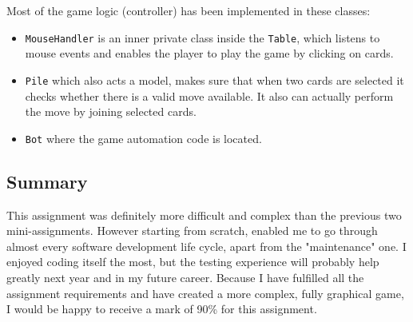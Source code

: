 \documentclass[a4paper, 11pt, titlepage]{article}
\begin{document}
Most of the game logic (controller) has been implemented in these classes:
\begin{itemize}
	\item \texttt{MouseHandler} is an inner private class inside the \texttt{Table}, 
		which listens to mouse events and enables the player to play the game by 
		clicking on cards. 
	
	\item \texttt{Pile} which also acts a model, makes sure that when two cards are 
		selected it checks whether there is a valid move available. It also can actually
		perform the move by joining selected cards.
	
	\item \texttt{Bot} where the game automation code is located. 
\end{itemize}

\subsection{Summary}
This assignment was definitely more difficult and complex than the previous two 
mini-assignments. However starting from scratch, enabled me to go through almost
every software development life cycle, apart from the "maintenance" one. I enjoyed coding
itself the most, but the testing experience will probably help greatly next year and in
my future career. Because I have fulfilled all the assignment requirements and have created 
a more complex, fully graphical game, I would be happy to receive a mark of 90\% for 
this assignment.
\end{document}
